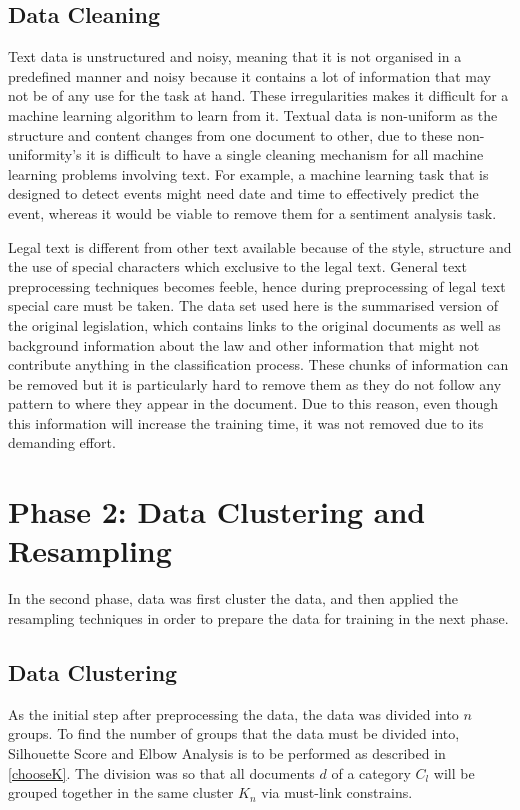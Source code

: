 \subsection*{Data Cleaning}\label{ConceptCleaning}

Text data is unstructured and noisy, meaning that it is not organised in a predefined manner and noisy because it contains a lot of information that may not be of any use for the task at hand. These irregularities makes it difficult for a machine learning algorithm to learn from it. Textual data is non-uniform as the structure and content changes from one document to other, due to these non-uniformity's it is difficult to have a single cleaning mechanism for all machine learning problems involving text. For example, a machine learning task that is designed to detect events might need date and time to effectively predict the event, whereas it would be viable to remove them for a sentiment analysis task.

Legal text is different from other text available because of the style, structure \cite{boella2011using} and the use of special characters which exclusive to the legal text. General text preprocessing techniques becomes feeble, hence during preprocessing of legal text special care must be taken. The data set used here is the summarised version of the original legislation, which contains links to the original documents as well as background information about the law and other information that might not contribute anything in the classification process. These chunks of information can be removed but it is particularly hard to remove them as they do not follow any pattern to where they appear in the document. Due to this reason, even though this information will increase the training time, it was not removed due to its demanding effort.

\section{Phase 2: Data Clustering and Resampling}
In the second phase, data was first cluster the data, and then applied the resampling techniques in order to prepare the data for training in the next phase.
\subsection*{Data Clustering}\label{concpeClustering}
As the initial step after preprocessing the data, the data was divided into $n$ groups. To find the number of groups that the data must be divided into, Silhouette Score and Elbow Analysis is to be performed  as described in \ref{chooseK}. The division was so that all documents $d$ of a category $C_{l}$ will be grouped together in the same cluster $K_{n}$ via must-link constrains.


